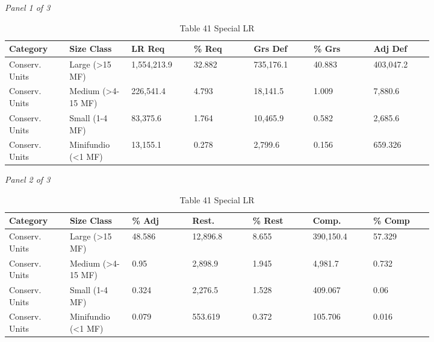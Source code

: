 \documentclass[12pt]{article}
\begin{document}
\begin{landscape}
\begin{table}[H]
\centering
\caption{Table 41 Special LR}
\textit{Panel 1 of 3}\\[2pt]
{\fontsize{12}{14}\selectfont
\setlength{\tabcolsep}{3pt}
\renewcommand{\arraystretch}{1.08}
\begin{tabular}{p{0.117\linewidth}p{0.117\linewidth}p{0.117\linewidth}p{0.117\linewidth}p{0.117\linewidth}p{0.117\linewidth}p{0.117\linewidth}}
\toprule
Category & Size Class & LR Req & \% Req & Grs Def & \% Grs & Adj Def \\
\midrule
Conserv. Units & Large (>15 MF) & 1,554,213.9 & 32.882 & 735,176.1 & 40.883 & 403,047.2 \\
Conserv. Units & Medium (>4-15 MF) & 226,541.4 & 4.793 & 18,141.5 & 1.009 & 7,880.6 \\
Conserv. Units & Small (1-4 MF) & 83,375.6 & 1.764 & 10,465.9 & 0.582 & 2,685.6 \\
Conserv. Units & Minifundio (<1 MF) & 13,155.1 & 0.278 & 2,799.6 & 0.156 & 659.326 \\
\bottomrule
\end{tabular}
}

\vspace{0.6em}

\textit{Panel 2 of 3}\\[2pt]
{\fontsize{12}{14}\selectfont
\setlength{\tabcolsep}{3pt}
\renewcommand{\arraystretch}{1.08}
\begin{tabular}{p{0.117\linewidth}p{0.117\linewidth}p{0.117\linewidth}p{0.117\linewidth}p{0.117\linewidth}p{0.117\linewidth}p{0.117\linewidth}}
\toprule
Category & Size Class & \% Adj & Rest. & \% Rest & Comp. & \% Comp \\
\midrule
Conserv. Units & Large (>15 MF) & 48.586 & 12,896.8 & 8.655 & 390,150.4 & 57.329 \\
Conserv. Units & Medium (>4-15 MF) & 0.95 & 2,898.9 & 1.945 & 4,981.7 & 0.732 \\
Conserv. Units & Small (1-4 MF) & 0.324 & 2,276.5 & 1.528 & 409.067 & 0.06 \\
Conserv. Units & Minifundio (<1 MF) & 0.079 & 553.619 & 0.372 & 105.706 & 0.016 \\
\bottomrule
\end{tabular}
}

\vspace{0.6em}


\end{table}
\end{landscape}
\end{document}
